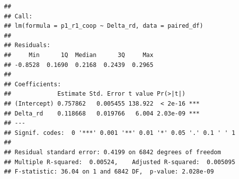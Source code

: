 \documentclass[
]{article}
\begin{document}
\begin{verbatim}
## 
## Call:
## lm(formula = p1_r1_coop ~ Delta_rd, data = paired_df)
## 
## Residuals:
##     Min      1Q  Median      3Q     Max 
## -0.8528  0.1690  0.2168  0.2439  0.2965 
## 
## Coefficients:
##             Estimate Std. Error t value Pr(>|t|)    
## (Intercept) 0.757862   0.005455 138.922  < 2e-16 ***
## Delta_rd    0.118668   0.019766   6.004 2.03e-09 ***
## ---
## Signif. codes:  0 '***' 0.001 '**' 0.01 '*' 0.05 '.' 0.1 ' ' 1
## 
## Residual standard error: 0.4199 on 6842 degrees of freedom
## Multiple R-squared:  0.00524,    Adjusted R-squared:  0.005095 
## F-statistic: 36.04 on 1 and 6842 DF,  p-value: 2.028e-09
\end{verbatim}
\end{document}
